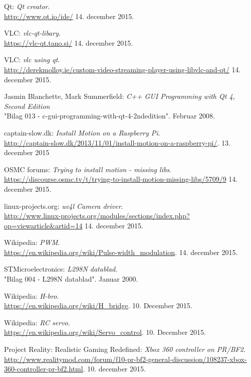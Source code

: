 \begin{thebibliography}{2}
 Qt: \textit{Qt creator}. \\
\url{http://www.qt.io/ide/} 14. december 2015.

 VLC: \textit{vlc-qt-libary}. \\
\url{https://vlc-qt.tano.si/} 14. december 2015.

 VLC: \textit{vlc using qt}. \\
\url{http://derekmolloy.ie/custom-video-streaming-player-using-libvlc-and-qt/} 14. december 2015.

 Jasmin Blanchette, Mark Summerfield: \textit{C++ GUI Programming with Qt 4, Second Edition} \\
"Bilag 013 - c-gui-programming-with-qt-4-2ndedition". Februar 2008.

captain-slow.dk: \textit{Install Motion on a Raspberry Pi}. \\
\url{http://captain-slow.dk/2013/11/01/install-motion-on-a-raspberry-pi/}. 13. december 2015

 OSMC forums: \textit{Trying to install motion - missing libs}. \\
\url{https://discourse.osmc.tv/t/trying-to-install-motion-missing-libs/5709/9} 14. december 2015.

 linux-projects.org: \textit{uv4l Camera driver}. \\
\url{http://www.linux-projects.org/modules/sections/index.php?op=viewarticle&artid=14} 14. december 2015.

 Wikipedia: \textit{PWM}.\\
\url{https://en.wikipedia.org/wiki/Pulse-width_modulation}. 14. december 2015.

 STMicroelectronics: \textit{L298N datablad}. \\
"Bilag 004 - L298N datablad". Januar 2000.

 Wikipedia: \textit{H-bro}.\\
\url{https://en.wikipedia.org/wiki/H_bridge}. 10. December 2015.

 Wikipedia: \textit{RC servo}. \\
\url{https://en.wikipedia.org/wiki/Servo_control}. 10. December 2015.

 Project Reality: Realistic Gaming Redefined: \textit{Xbox 360 controller on PR/BF2}. \\
\url{http://www.realitymod.com/forum/f10-pr-bf2-general-discussion/108237-xbox-360-controller-pr-bf2.html}. 10. december 2015.


\end{thebibliography}
